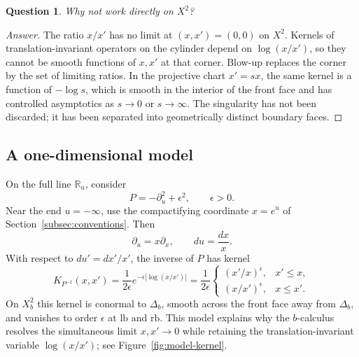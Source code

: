 \documentclass[12pt,oneside,reqno]{article}
\theoremstyle{plain}
\newtheorem{question}[theorem]{Question}
\theoremstyle{definition}
\theoremstyle{remark}
\newenvironment{answer}{\begin{proof}[Answer]}{\end{proof}}
\begin{document}
\begin{question}
Why not work directly on \(X^2\)?
\end{question}

\begin{answer}
The ratio \(x/x'\) has no limit at \((x,x')=(0,0)\) on \(X^2\). Kernels of
translation-invariant operators on the cylinder depend on
\(\log(x/x')\), so they cannot be smooth functions of \(x,x'\) at that
corner. Blow-up replaces the corner by the set of limiting ratios. In the
projective chart \(x'=sx\), the same kernel is a function of
\(-\log s\), which is smooth in the interior of the front face and has
controlled asymptotics as \(s\to0\) or \(s\to\infty\). The singularity
has not been discarded; it has been separated into geometrically distinct
boundary faces.
\end{answer}

\subsection{A one-dimensional model}

On the full line \(\mathbb R_u\), consider
\[
 P=-\partial_u^2+\epsilon^2,\qquad \epsilon>0.
\]
Near the end \(u=-\infty\), use the compactifying coordinate \(x=e^u\)
of Section~\ref{subsec:conventions}.
Then
\[
 \partial_u=x\partial_x,\qquad du=\frac{dx}{x}.
\]
With respect to \(du'=dx'/x'\), the inverse of \(P\) has kernel
\[
 K_{P^{-1}}(x,x')
 =\frac{1}{2\epsilon}
   e^{-\epsilon|\log(x/x')|}
 =\frac{1}{2\epsilon}
 \begin{cases}
  (x'/x)^\epsilon,&x'\leq x,\\
  (x/x')^\epsilon,&x\leq x'.
 \end{cases}
\]
On $X_b^2$ this kernel is conormal to $\Delta_b$, smooth across the
front face away from $\Delta_b$, and vanishes to order $\epsilon$ at
$\mathrm{lb}$ and $\mathrm{rb}$. This model explains why the
$b$-calculus resolves the simultaneous limit $x,x'\to0$ while retaining
the translation-invariant variable $\log(x/x')$; see
Figure~\ref{fig:model-kernel}.
\end{document}
